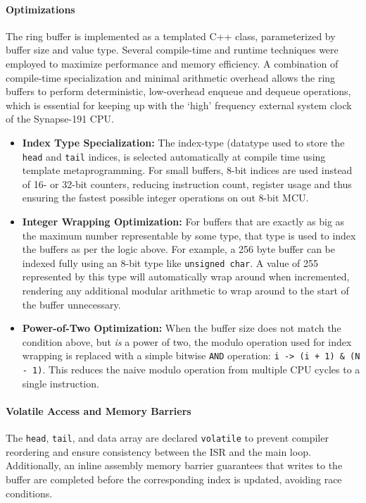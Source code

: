 \paragraph{Optimizations} The ring buffer is implemented as a templated C++ class, parameterized by buffer size and value type. Several compile-time and runtime techniques were employed to maximize performance and memory efficiency. A combination of compile-time specialization and minimal arithmetic overhead allows the ring buffers to perform deterministic, low-overhead enqueue and dequeue operations, which is essential for keeping up with the `high' frequency external system clock of the Synapse-191 CPU.

\begin{itemize}
\item \textbf{Index Type Specialization:} The index-type (datatype used to store the \texttt{head} and \texttt{tail} indices, is selected automatically at compile time using template metaprogramming. For small buffers, 8-bit indices are used instead of 16- or 32-bit counters, reducing instruction count, register usage and thus ensuring the fastest possible integer operations on out 8-bit MCU.
\item \textbf{Integer Wrapping Optimization:} For buffers that are exactly as big as the maximum number representable by some type, that type is used to index the buffers as per the logic above. For example, a 256 byte buffer can be indexed fully using an 8-bit type like \texttt{unsigned char}. A value of 255 represented by this type will automatically wrap around when incremented, rendering any additional modular arithmetic to wrap around to the start of the buffer unnecessary.
\item \textbf{Power-of-Two Optimization:} When the buffer size does not match the condition above, but \emph{is} a power of two, the modulo operation used for index wrapping is replaced with a simple bitwise \texttt{AND} operation: \texttt{i -> (i + 1) \& (N - 1)}. This reduces the naive modulo operation from multiple CPU cycles to a single instruction.
\end{itemize}

\paragraph{Volatile Access and Memory Barriers} The \texttt{head}, \texttt{tail}, and data array are declared \texttt{volatile} to prevent compiler reordering and ensure consistency between the ISR and the main loop. Additionally, an inline assembly memory barrier guarantees that writes to the buffer are completed before the corresponding index is updated, avoiding race conditions.

